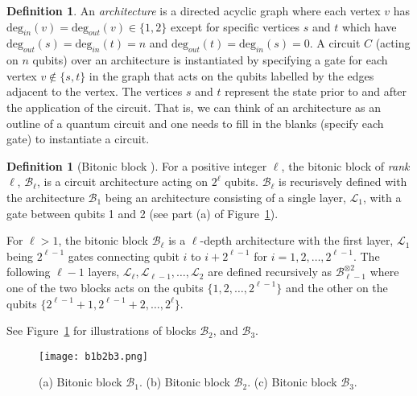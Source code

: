 \documentclass[11pt,letterpaper]{article}
\theoremstyle{definition}
\newtheorem{definition}[theorem]{Definition}
\theoremstyle{remark}
\newcommand{\cB}{\mathcal B}
\newcommand{\cL}{\mathcal L}
\numberwithin{equation}{section}
\theoremstyle{definition}
\begin{document}
\begin{definition}An \emph{architecture} is a directed acyclic graph where each vertex $v$ has $\mathrm{deg}_{in}(v) = \mathrm{deg}_{out}(v) \in \{1,2\}$ except for specific vertices $s$ and $t$ which have $\mathrm{deg}_{out}(s) = \mathrm{deg}_{in}(t) = n$ and $\mathrm{deg}_{out}(t) = \mathrm{deg}_{in}(s) = 0$. A circuit $C$ (acting on $n$ qubits) over an architecture is instantiated by specifying a gate for each vertex $v \notin \{s,t\}$ in the graph that acts on the qubits labelled by the edges adjacent to the vertex. The vertices $s$ and $t$ represent the state prior to and after the application of the circuit. That is, we can think of an architecture as an outline of a quantum circuit and one needs to fill in the blanks (specify each gate) to instantiate a circuit.
\label{def:architecture}
\end{definition}

%
%
%
%


\begin{definition}[Bitonic block \cite{Batcher:1968:SNA:1468075.1468121}]
\label{def:bitonicblock}
For a positive integer $\ell$, the bitonic block of \emph{rank} $\ell$, $\cB_\ell$, is a circuit architecture acting on $2^\ell$ qubits. $\cB_\ell$ is recurisvely defined with the architecture $\cB_1$ being an architecture consisting of a single layer, $\cL_1$, with a gate between qubits 1 and 2 (see part (a) of Figure~\ref{fig:b1b2b3}).

%
%
%
%
For $\ell > 1$, the bitonic block $\cB_\ell$ is a $\ell$-depth architecture with the first layer, $\cL_1$ being $2^{\ell-1}$ gates connecting qubit $i$ to $i + 2^{\ell-1}$ for $i = 1, 2, \ldots, 2^{\ell-1}$. The following $\ell-1$ layers, $\cL_\ell, \cL_{\ell-1}, \ldots, \cL_2$ are defined recursively as $\cB_{\ell-1}^{\otimes 2}$ where one of the two blocks acts on the qubits $\{1, 2, \ldots, 2^{\ell-1}\}$ and the other on the qubits $\{2^{\ell-1} + 1, 2^{\ell-1} + 2, \ldots, 2^\ell\}$.
\end{definition}

\noindent See Figure~\ref{fig:b1b2b3} for illustrations of blocks $\cB_2$, and $\cB_3$.

%
%
%
%
%
%
%
%
%

\begin{figure}[ht]
\centering
\texttt{[image: b1b2b3.png]}
\caption{(a) Bitonic block $\mathcal{B}_1$.  (b) Bitonic block $\mathcal{B}_2$.  (c) Bitonic block $\mathcal{B}_3$.}
\label{fig:b1b2b3}
\end{figure}
\end{document}
